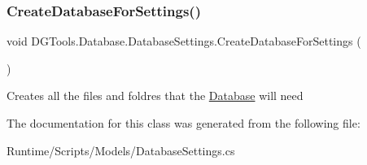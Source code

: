\subsubsection{\texorpdfstring{CreateDatabaseForSettings()}{CreateDatabaseForSettings()}}
{\footnotesize\ttfamily void D\+G\+Tools.\+Database.\+Database\+Settings.\+Create\+Database\+For\+Settings (\begin{DoxyParamCaption}{ }\end{DoxyParamCaption})}



Creates all the files and foldres that the \mbox{\hyperlink{class_d_g_tools_1_1_database_1_1_database}{Database}} will need 



The documentation for this class was generated from the following file\+:\begin{DoxyCompactItemize}
\item 
Runtime/\+Scripts/\+Models/Database\+Settings.\+cs\end{DoxyCompactItemize}
